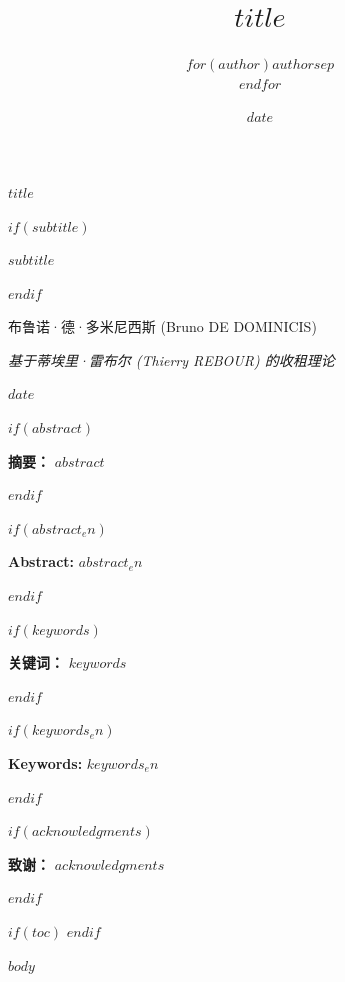 \documentclass[11pt]{article}
\title{$title$}
\author{$for(author)$$author$$sep$ \\ $endfor$}
\date{$date$}
\renewcommand{\maketitle}{
  \begin{center}
  \vspace*{1cm}

  \begin{minipage}{\textwidth}
  \centering
  \fontsize{20}{26}\selectfont\textbf{$title$}
  \end{minipage}

  \vspace{1.2cm}

  $if(subtitle)$
  \begin{minipage}{\textwidth}
  \centering
  \fontsize{13}{16}\selectfont\itshape $subtitle$
  \end{minipage}
  $endif$

  \vspace{2.6cm}

  \begin{minipage}{\textwidth}
  \centering
  \Large
  布鲁诺·德·多米尼西斯 (Bruno DE DOMINICIS)
  \vspace{0.3cm}
  
  \normalsize
  \textit{基于蒂埃里·雷布尔 (Thierry REBOUR) 的收租理论}
  \end{minipage}

  \vspace{2.6cm}

  \Large $date$

  \end{center}
  \vspace{1cm}
}
\begin{document}
\maketitle
\thispagestyle{firstpage}

$if(abstract)$
\begin{center}
\begin{minipage}{0.85\textwidth}
\noindent \textbf{摘要：} $abstract$
\end{minipage}
\end{center}
\vspace{0.5cm}
$endif$

$if(abstract_en)$
\begin{center}
\begin{minipage}{0.85\textwidth}
\noindent \textbf{Abstract:} $abstract_en$
\end{minipage}
\end{center}
\vspace{0.5cm}
$endif$

$if(keywords)$
\begin{center}
\begin{minipage}{0.85\textwidth}
\noindent \textbf{关键词：} $keywords$
\end{minipage}
\end{center}
\vspace{0.5cm}
$endif$

$if(keywords_en)$
\begin{center}
\begin{minipage}{0.85\textwidth}
\noindent \textbf{Keywords:} $keywords_en$
\end{minipage}
\end{center}
\vspace{0.5cm}
$endif$

$if(acknowledgments)$
\begin{center}
\begin{minipage}{0.85\textwidth}
\noindent \textbf{致谢：} $acknowledgments$
\end{minipage}
\end{center}
\vspace{1cm}
$endif$

$if(toc)$
\clearpage
\tableofcontents
\clearpage
$endif$

\clearpage
\pagestyle{fancy}

$body$

\end{document}
